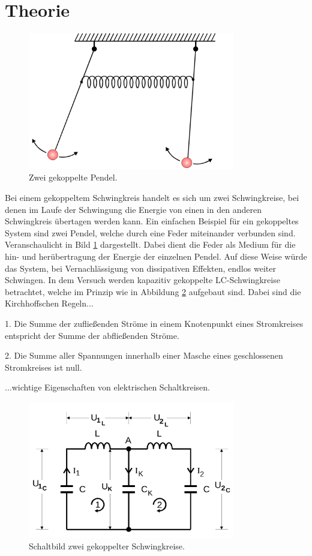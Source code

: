 \section{Theorie}
\label{sec:Theorie}

\begin{figure}
\label{fig:Bild1}
    \centering
    \includegraphics[height=6.0cm]{data/Bild1.png}
    \caption{Zwei gekoppelte Pendel.}
\end{figure}

Bei einem gekoppeltem Schwingkreis handelt es sich um zwei Schwingkreise, bei denen im Laufe der Schwingung
die Energie von einen in den anderen Schwingkreis übertagen werden kann. Ein einfachen Beispiel für ein gekoppeltes
System sind zwei Pendel, welche durch eine Feder miteinander verbunden sind. Veranschaulicht in Bild \ref{fig:Bild1} dargestellt. Dabei dient die Feder als Medium für die hin- und herübertragung der Energie der einzelnen Pendel.
Auf diese Weise würde das System, bei Vernachlässigung von dissipativen Effekten, endlos weiter Schwingen.
In dem Versuch werden kapazitiv gekoppelte LC-Schwingkreise betrachtet, welche im Prinzip wie in Abbildung \ref{fig:Bild2}
aufgebaut sind. Dabei sind die Kirchhoffschen Regeln...

1.  Die Summe der zufließenden Ströme in einem Knotenpunkt eines Stromkreises entspricht
    der Summe der abfließenden Ströme.

2.  Die Summe aller Spannungen innerhalb einer Masche eines geschlossenen Stromkreises
    ist null.

...wichtige Eigenschaften von elektrischen Schaltkreisen.

\begin{figure}
\label{fig:Bild2}
    \centering
    \includegraphics[height=6.0cm]{data/Bild2.png}
    \caption{Schaltbild zwei gekoppelter Schwingkreise.}
\end{figure}

